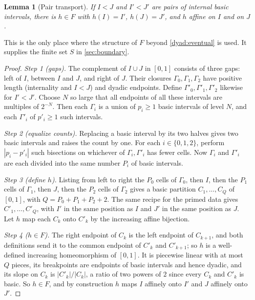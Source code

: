 \documentclass[11pt]{article}
\newtheorem{lemma}[theorem]{Lemma}
\theoremstyle{definition}
\numberwithin{equation}{section}
\begin{document}
\begin{lemma}[Pair transport]\label{dyad:transport}
If \(I<J\) and \(I'<J'\) are pairs of internal basic intervals, there is
\(h\in F\) with \(h(I)=I'\), \(h(J)=J'\), and \(h\) affine on \(I\) and on
\(J\).
\end{lemma}
This is the only place where the structure of \(F\) beyond
\cref{dyad:eventual} is used. It supplies the finite set \(S\) in
\cref{sec:boundary}.

\begin{proof}
\emph{Step 1 (gaps).} The complement of \(I\cup J\) in \([0,1]\) consists of
three gaps: left of \(I\), between \(I\) and \(J\), and right of \(J\). Their
closures \(\Gamma_0,\Gamma_1,\Gamma_2\) have positive length (internality and
\(I<J\)) and dyadic endpoints. Define
\(\Gamma'_0,\Gamma'_1,\Gamma'_2\) likewise for \(I'<J'\). Choose \(N\) so
large that all endpoints of all these intervals are multiples of \(2^{-N}\).
Then each \(\Gamma_i\) is a union of \(p_i\ge1\) basic intervals of level
\(N\), and each \(\Gamma'_i\) of \(p'_i\ge1\) such intervals.

\emph{Step 2 (equalize counts).} Replacing a basic interval by its two halves
gives two basic intervals and raises the count by one. For each
\(i\in\{0,1,2\}\), perform \(|p_i-p'_i|\) such bisections on whichever of
\(\Gamma_i,\Gamma'_i\) has fewer cells. Now \(\Gamma_i\) and \(\Gamma'_i\) are
each divided into the same number \(P_i\) of basic intervals.

\emph{Step 3 (define \(h\)).} Listing from left to right the \(P_0\) cells of
\(\Gamma_0\), then \(I\), then the \(P_1\) cells of \(\Gamma_1\), then \(J\),
then the \(P_2\) cells of \(\Gamma_2\) gives a basic partition
\(C_1,\dots,C_Q\) of \([0,1]\), with \(Q=P_0+P_1+P_2+2\). The same recipe for
the primed data gives \(C'_1,\dots,C'_Q\), with \(I'\) in the same position as
\(I\) and \(J'\) in the same position as \(J\). Let \(h\) map each \(C_k\)
onto \(C'_k\) by the increasing affine bijection.

\emph{Step 4 (\(h\in F\)).} The right endpoint of \(C_k\) is the left
endpoint of \(C_{k+1}\), and both definitions send it to the common endpoint
of \(C'_k\) and \(C'_{k+1}\); so \(h\) is a well-defined increasing
homeomorphism of \([0,1]\). It is piecewise linear with at most \(Q\) pieces,
its breakpoints are endpoints of basic intervals and hence dyadic, and its
slope on \(C_k\) is \(|C'_k|/|C_k|\), a ratio of two powers of \(2\) since
every \(C_k\) and \(C'_k\) is basic. So \(h\in F\), and by construction \(h\)
maps \(I\) affinely onto \(I'\) and \(J\) affinely onto \(J'\).
\end{proof}
\end{document}
